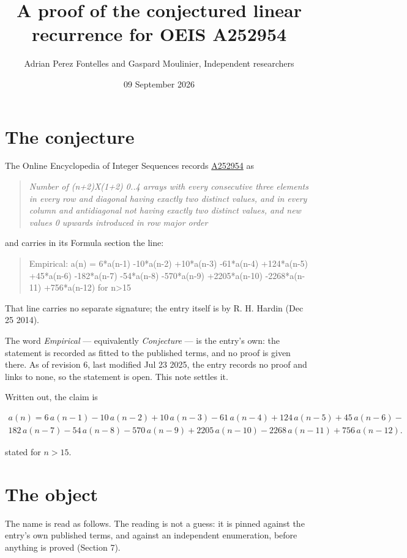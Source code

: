 \documentclass[11pt]{article}
\title{A proof of the conjectured linear recurrence for OEIS A252954}
\author{Adrian Perez Fontelles and Gaspard Moulinier, Independent researchers}
\date{09 September 2026}
\theoremstyle{definition}
\begin{document}
\maketitle
\section{The conjecture}

The Online Encyclopedia of Integer Sequences records \href{https://oeis.org/A252954}{A252954} as

\begin{quote}\itshape Number of (n+2)X(1+2) 0..4 arrays with every consecutive three elements in every row and diagonal having exactly two distinct values, and in every column and antidiagonal not having exactly two distinct values, and new values 0 upwards introduced in row major order\end{quote}

and carries in its Formula section the line:

\begin{quote}\ttfamily Empirical: a(n) = 6*a(n-1) -10*a(n-2) +10*a(n-3) -61*a(n-4) +124*a(n-5) +45*a(n-6) -182*a(n-7) -54*a(n-8) -570*a(n-9) +2205*a(n-10) -2268*a(n-11) +756*a(n-12) for n>15\end{quote}

That line carries no separate signature; the entry itself is by R. H. Hardin (Dec 25 2014).

The word {\itshape Empirical} --- equivalently {\itshape Conjecture} --- is the entry's own: the statement is recorded as fitted to the published terms, and no proof is given there. As of revision 6, last modified Jul 23 2025, the entry records no proof and links to none, so the statement is open. This note settles it.

Written out, the claim is

\begin{multline*} a(n) = 6\,a(n-1) - 10\,a(n-2) + 10\,a(n-3) - 61\,a(n-4) + 124\,a(n-5) + 45\,a(n-6) - \\ 182\,a(n-7) - 54\,a(n-8) - 570\,a(n-9) + 2205\,a(n-10) - 2268\,a(n-11) + 756\,a(n-12). \end{multline*}

stated for $n > 15$.

\section{The object}

The name is read as follows. The reading is not a guess: it is pinned against the entry's own published terms, and against an independent enumeration, before anything is proved (Section 7).
\end{document}
